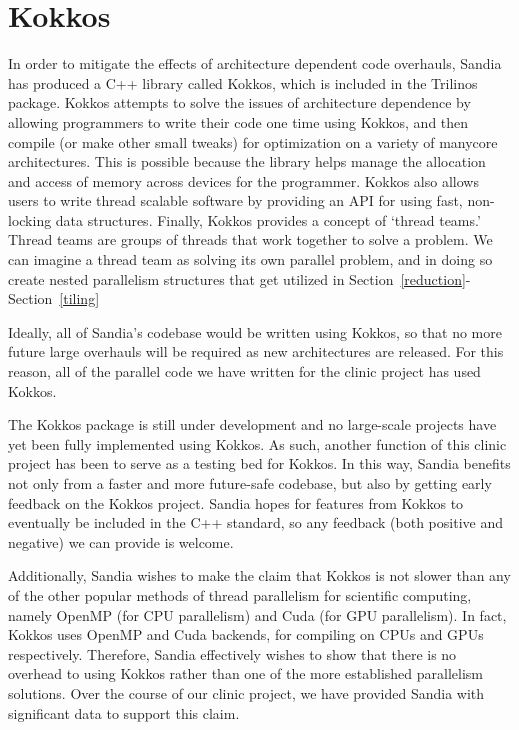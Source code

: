 \section{Kokkos}

In order to mitigate the effects of architecture dependent code overhauls, Sandia has produced a C++ library called
Kokkos, which is included in the Trilinos package. Kokkos attempts to solve the issues of architecture dependence 
by allowing programmers to write their code one time using Kokkos, and then compile (or make other small tweaks) 
for optimization on a variety of manycore architectures.
This is possible because the library helps manage the allocation and access of memory across devices for the
programmer. Kokkos also allows users to write thread scalable software by providing an API for
using fast, non-locking data structures. Finally, Kokkos provides a concept of `thread teams.' Thread teams are 
groups of threads that work together to solve a problem. We can imagine a thread team as solving its own parallel 
problem, and in doing so create nested parallelism structures that get utilized in Section~\ref{reduction}-Section~\ref{tiling}

Ideally, all of Sandia's codebase would be written using Kokkos, so that 
no more future large overhauls will be required as new architectures are released. For this reason, all of 
the parallel code we have written for the clinic project has used Kokkos.

The Kokkos package is still under development and no large-scale projects have yet been fully implemented using Kokkos. 
As such, another function of this clinic project 
has been to serve as a testing bed for Kokkos. 
In this way, Sandia benefits not only from a faster and more future-safe codebase, but also by getting early feedback 
on the Kokkos project. Sandia hopes for features from Kokkos to eventually be included in the C++ standard,
so any feedback (both positive and negative) we can provide is welcome. 

Additionally, Sandia wishes to 
make the claim that Kokkos is not slower than any of the other popular methods of thread parallelism for scientific
computing, namely OpenMP (for CPU parallelism) and Cuda (for GPU parallelism). In fact, Kokkos uses OpenMP and Cuda 
backends, for compiling on CPUs and GPUs respectively. Therefore, Sandia effectively wishes to show that there is 
no overhead to using Kokkos rather than one of the more established parallelism solutions. Over the course of our clinic
project, we have provided Sandia with significant data to support this claim.










